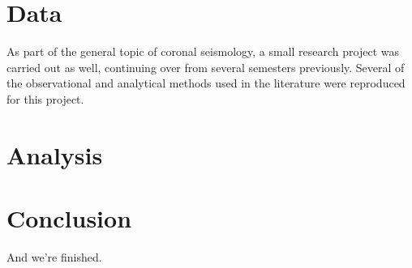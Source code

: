 \documentclass[preprint2]{aastex}
\begin{document}
\section{Data}\label{data}
As part of the general topic of coronal seismology,
a small research project was carried out as well, continuing
over from several semesters previously. Several of the observational
and analytical methods used in the literature were reproduced for
this project.

\section{Analysis}\label{analysis}

\section{Conclusion}\label{conclusion}
And we're finished.


\end{document}
